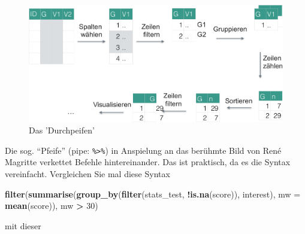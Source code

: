 \documentclass[12pt,ngerman,paper=a4,pagesize,DIV=13]{scrreprt}
\newenvironment{Shaded}{\begin{snugshade}}{\end{snugshade}}
\newcommand{\DataTypeTok}[1]{\textcolor[rgb]{0.13,0.29,0.53}{#1}}
\newcommand{\DecValTok}[1]{\textcolor[rgb]{0.00,0.00,0.81}{#1}}
\newcommand{\KeywordTok}[1]{\textcolor[rgb]{0.13,0.29,0.53}{\textbf{#1}}}
\newcommand{\NormalTok}[1]{#1}
\newcommand{\OperatorTok}[1]{\textcolor[rgb]{0.81,0.36,0.00}{\textbf{#1}}}
\newcommand{\StringTok}[1]{\textcolor[rgb]{0.31,0.60,0.02}{#1}}
\begin{document}
\begin{figure}

{\centering \includegraphics[width=0.9\linewidth]{Inhalte/images/Datenjudo/durchpfeifen} 

}

\caption{Das 'Durchpeifen'}\label{fig:fig-durchpfeifen}
\end{figure}

Die sog. \enquote{Pfeife} (pipe: \texttt{\%\textgreater{}\%}) in
Anspielung an das berühmte Bild von René Magritte verkettet Befehle
hintereinander. Das ist praktisch, da es die Syntax vereinfacht.
Vergleichen Sie mal diese Syntax

\begin{Shaded}
\begin{Highlighting}[]
\KeywordTok{filter}\NormalTok{(}\KeywordTok{summarise}\NormalTok{(}\KeywordTok{group_by}\NormalTok{(}\KeywordTok{filter}\NormalTok{(stats_test, }\OperatorTok{!}\KeywordTok{is.na}\NormalTok{(score)), interest), }\DataTypeTok{mw =} \KeywordTok{mean}\NormalTok{(score)), mw }\OperatorTok{>}\StringTok{ }\DecValTok{30}\NormalTok{)}
\end{Highlighting}
\end{Shaded}

mit dieser

\begin{Shaded}
\end{Shaded}
\end{document}
